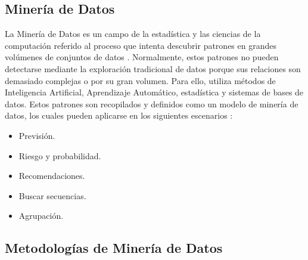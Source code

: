 \subsection{Minería de Datos}

La Minería de Datos es un campo de la estadística y las ciencias de la computación referido al proceso que intenta descubrir patrones en grandes volúmenes de conjuntos de datos \parencite{bk_maimon2010datamining}. Normalmente, estos patrones no pueden detectarse mediante la exploración tradicional de datos porque sus relaciones son demasiado complejas o por su gran volumen. Para ello, utiliza métodos de Inteligencia Artificial, Aprendizaje Automático, estadística y sistemas de bases de datos. Estos patrones son recopilados y definidos como un modelo de minería de datos, los cuales pueden aplicarse en los siguientes escenarios \parencite{gl_microsoft2019datamining}:
\begin{itemize}
	\item Previsión.
	\item Riesgo y probabilidad.
	\item Recomendaciones.
	\item Buscar secuencias.
	\item Agrupación.
\end{itemize}
\clearpage

\subsection{Metodologías de Minería de Datos}

